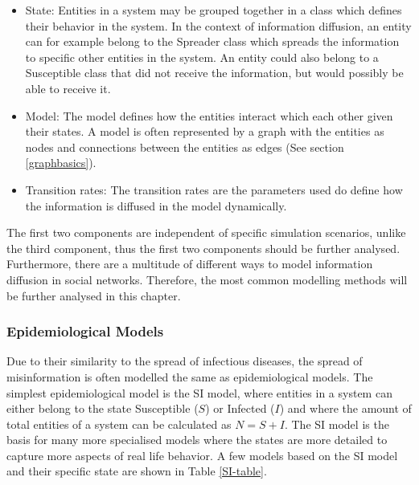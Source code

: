 \begin{itemize}
    \item State: Entities in a system may be grouped together in a class which
    defines their behavior in the system. In the context of information diffusion,
    an entity can for example belong to the  \glqq Spreader \grqq{} class which spreads the information
    to specific other entities in the system. An entity could also belong to a
    \glqq Susceptible \grqq{} class that did not receive the information, 
    but would possibly be able to receive it.
    \item Model: The model defines how the entities interact which each other
    given their states. A model is often represented by a graph with the entities
    as nodes and connections between the entities as edges 
    (See section \ref{graphbasics}).
    \item Transition rates: The transition rates are the parameters used
    do define how the information is diffused in the model dynamically. 
\end{itemize}

The first two components are independent of specific simulation scenarios,
unlike the third component, thus the first two components should be further
analysed. Furthermore, there are a multitude of different ways 
to model information diffusion in social networks. Therefore, the most common
modelling methods will be further analysed in this chapter.

\subsubsection{Epidemiological Models}

Due to their similarity to the spread of infectious diseases, 
the spread of misinformation is often modelled the same as epidemiological models.
The simplest epidemiological model is the SI model, where entities in a system
can either belong to the state \glqq Susceptible\grqq{} ($S$) or 
\glqq Infected\grqq{} ($I$) and where the amount of total entities of a 
system can be calculated as $N=S+I$. The SI model is the basis for many
more specialised models where the states are more detailed to capture more 
aspects of real life behavior. A few models based on the SI model and their 
specific state are shown in Table \ref{SI-table}.

